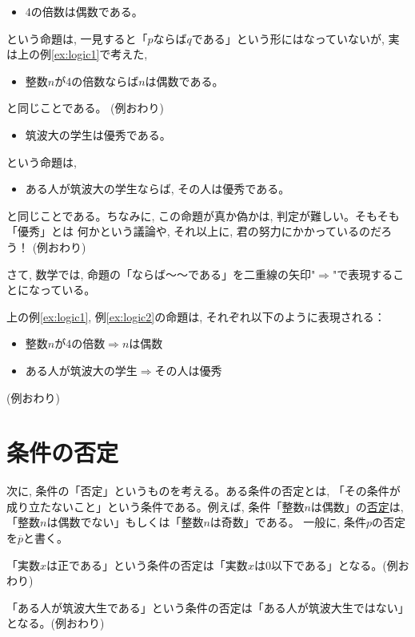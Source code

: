 \begin{exmpl}
\begin{itemize}
\item 4の倍数は偶数である。
\end{itemize}
という命題は, 一見すると「$p$ならば$q$である」という形にはなっていないが, 実は上の例\ref{ex:logic1}で考えた, 
\begin{itemize}
\item 整数$n$が4の倍数ならば$n$は偶数である。
\end{itemize}
と同じことである。
(例おわり)\end{exmpl}
\mv

\begin{exmpl}\label{ex:logic2}
\begin{itemize}
\item 筑波大の学生は優秀である。
\end{itemize}
という命題は, 
\begin{itemize}
\item ある人が筑波大の学生ならば, その人は優秀である。
\end{itemize}
と同じことである。ちなみに, この命題が真か偽かは, 判定が難しい。そもそも「優秀」とは
何かという議論や, それ以上に, 君の努力にかかっているのだろう！
(例おわり)\end{exmpl}
\mv

さて, 数学では, 命題の「ならば〜〜である」を二重線の矢印"$\Longrightarrow$"で表現することになっている。
\begin{exmpl} 上の例\ref{ex:logic1}, 例\ref{ex:logic2}の命題は, それぞれ以下のように表現される：
\begin{itemize}
\item 整数$n$が4の倍数$\Longrightarrow n$は偶数
\item ある人が筑波大の学生$\Longrightarrow$その人は優秀
\end{itemize}
(例おわり)\end{exmpl}
\vv


\section{条件の否定}

次に, 条件の「否定」というものを考える。ある条件の否定とは, 
「その条件が成り立たないこと」という条件である。例えば, 
条件「整数$n$は偶数」の\underline{否定}は, 
「整数$n$は偶数でない」もしくは「整数$n$は奇数」である。
一般に, 条件$p$の否定を$\overline{p}$と書く。\mv

\begin{exmpl} 「実数$x$は正である」という条件の否定は「実数$x$は0以下である」となる。(例おわり)\end{exmpl}
\begin{exmpl} 「ある人が筑波大生である」という条件の否定は「ある人が筑波大生ではない」となる。(例おわり)\end{exmpl}
\mv

